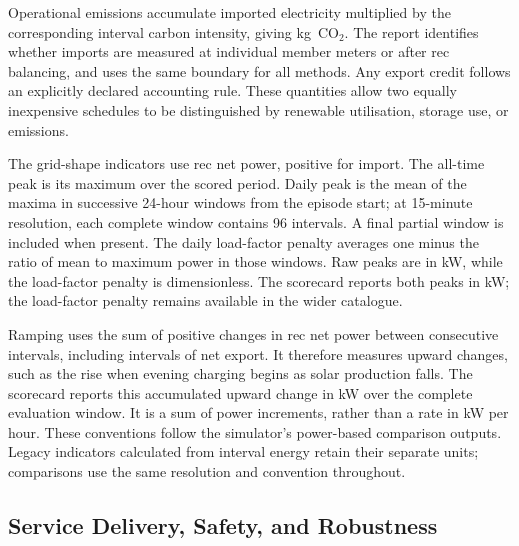 Operational emissions accumulate imported electricity multiplied by the corresponding interval carbon intensity, giving kg~CO$_2$. The report identifies whether imports are measured at individual member meters or after \gls{rec} balancing, and uses the same boundary for all methods. Any export credit follows an explicitly declared accounting rule. These quantities allow two equally inexpensive schedules to be distinguished by renewable utilisation, storage use, or emissions.

The grid-shape indicators use \gls{rec} net power, positive for import. The all-time peak is its maximum over the scored period. Daily peak is the mean of the maxima in successive 24-hour windows from the episode start; at 15-minute resolution, each complete window contains 96 intervals. A final partial window is included when present. The daily load-factor penalty averages one minus the ratio of mean to maximum power in those windows. Raw peaks are in kW, while the load-factor penalty is dimensionless. The scorecard reports both peaks in kW; the load-factor penalty remains available in the wider catalogue.

Ramping uses the sum of positive changes in \gls{rec} net power between consecutive intervals, including intervals of net export. It therefore measures upward changes, such as the rise when evening charging begins as solar production falls. The scorecard reports this accumulated upward change in kW over the complete evaluation window. It is a sum of power increments, rather than a rate in kW per hour. These conventions follow the simulator's power-based comparison outputs. Legacy indicators calculated from interval energy retain their separate units; comparisons use the same resolution and convention throughout.

\subsection{Service Delivery, Safety, and Robustness}
\label{sec:sim-service-evaluation}

